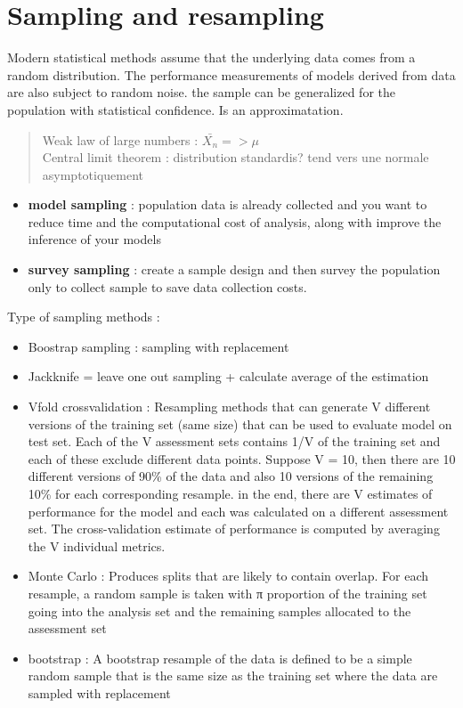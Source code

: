 \documentclass[]{book}
\providecommand{\tightlist}{%
  \setlength{\itemsep}{0pt}\setlength{\parskip}{0pt}}
\theoremstyle{definition}
\theoremstyle{definition}
\theoremstyle{definition}
\theoremstyle{remark}
\begin{document}
\section{Sampling and resampling}\label{sampling-and-resampling}

Modern statistical methods assume that the underlying data comes from a
random distribution. The performance measurements of models derived from
data are also subject to random noise. the sample can be generalized for
the population with statistical confidence. Is an approximatation.

\begin{quote}
Weak law of large numbers : \(\bar{X_n} => \mu\)\\
Central limit theorem : distribution standardis? tend vers une normale
asymptotiquement
\end{quote}

\begin{itemize}
\tightlist
\item
  \textbf{model sampling} : population data is already collected and you
  want to reduce time and the computational cost of analysis, along with
  improve the inference of your models
\item
  \textbf{survey sampling} : create a sample design and then survey the
  population only to collect sample to save data collection costs.
\end{itemize}

Type of sampling methods :

\begin{itemize}
\tightlist
\item
  Boostrap sampling : sampling with replacement
\item
  Jackknife = leave one out sampling + calculate average of the
  estimation
\item
  Vfold crossvalidation : Resampling methods that can generate V
  different versions of the training set (same size) that can be used to
  evaluate model on test set. Each of the V assessment sets contains 1/V
  of the training set and each of these exclude different data points.
  Suppose V = 10, then there are 10 different versions of 90\% of the
  data and also 10 versions of the remaining 10\% for each corresponding
  resample. in the end, there are V estimates of performance for the
  model and each was calculated on a different assessment set. The
  cross-validation estimate of performance is computed by averaging the
  V individual metrics.
\item
  Monte Carlo : Produces splits that are likely to contain overlap. For
  each resample, a random sample is taken with π proportion of the
  training set going into the analysis set and the remaining samples
  allocated to the assessment set
\item
  bootstrap : A bootstrap resample of the data is defined to be a simple
  random sample that is the same size as the training set where the data
  are sampled with replacement
\end{itemize}
\end{document}
